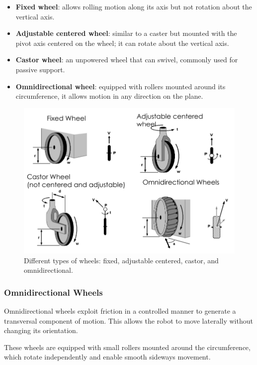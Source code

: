 \begin{itemize}
  \item \textbf{Fixed wheel}: allows rolling motion along its axis but not rotation about the vertical axis.
  \item \textbf{Adjustable centered wheel}: similar to a caster but mounted with the pivot axis centered on the wheel; it can rotate about the vertical axis.
  \item \textbf{Castor wheel}: an unpowered wheel that can swivel, commonly used for passive support.
  \item \textbf{Omnidirectional wheel}: equipped with rollers mounted around its circumference, it allows motion in any direction on the plane.
\end{itemize}

\begin{figure}[H]
  \centering
  \includegraphics[width=0.9\linewidth]{imgs/types_of_wheels.png}
  \caption{Different types of wheels: fixed, adjustable centered, castor, and omnidirectional.}
\end{figure}

\subsubsection*{Omnidirectional Wheels}

Omnidirectional wheels exploit friction in a controlled manner to generate a transversal component of motion. This allows the robot to move laterally without changing its orientation.

These wheels are equipped with small rollers mounted around the circumference, which rotate independently and enable smooth sideways movement.

